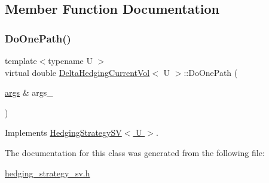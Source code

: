 \subsection{Member Function Documentation}
\hypertarget{classDeltaHedgingCurrentVol_ad235325f348bd58eb54d9dec389aa2e9}{}\label{classDeltaHedgingCurrentVol_ad235325f348bd58eb54d9dec389aa2e9} 
\subsubsection{\texorpdfstring{Do\+One\+Path()}{DoOnePath()}}
{\footnotesize\ttfamily template$<$typename U $>$ \\
virtual double \hyperlink{classDeltaHedgingCurrentVol}{Delta\+Hedging\+Current\+Vol}$<$ U $>$\+::Do\+One\+Path (\begin{DoxyParamCaption}\item[{\hyperlink{path__generation_8h_a75c13cde2074f502cc4348c70528572d}{args} \&}]{args\+\_\+ }\end{DoxyParamCaption})\hspace{0.3cm}{\ttfamily [virtual]}}



Implements \hyperlink{classHedgingStrategySV_abb9531c069f4d1e758fc23c4bc7ed09c}{Hedging\+Strategy\+S\+V$<$ U $>$}.



The documentation for this class was generated from the following file\+:\begin{DoxyCompactItemize}
\item 
\hyperlink{hedging__strategy__sv_8h}{hedging\+\_\+strategy\+\_\+sv.\+h}\end{DoxyCompactItemize}
